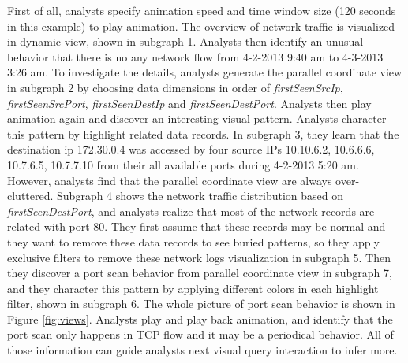 \documentclass[journal]{vgtc}                %
\begin{document}
{First of all, analysts specify animation speed and time window size (120 seconds in this example) to play animation. The overview of network traffic is visualized in dynamic view, shown in subgraph 1. Analysts then identify an unusual behavior that there is no any network flow from 4-2-2013 9:40 am to 4-3-2013 3:26 am. To investigate the details, analysts generate the parallel coordinate view in subgraph 2 by choosing data dimensions in order of \emph{firstSeenSrcIp}, \emph{firstSeenSrcPort}, \emph{firstSeenDestIp} and \emph{firstSeenDestPort}. Analysts then play animation again and discover an interesting visual pattern. Analysts character this pattern by highlight related data records. In subgraph 3, they learn that the destination ip 172.30.0.4 was accessed by four source IPs 10.10.6.2, 10.6.6.6, 10.7.6.5, 10.7.7.10 from their all available ports during 4-2-2013 5:20 am. However, analysts find that the parallel coordinate view are always over-cluttered.  Subgraph 4 shows the network traffic distribution based on \emph{firstSeenDestPort}, and analysts realize that most of the network records are related with port 80. They first assume that these records may be normal and they want to remove these data records to see buried patterns, so they apply exclusive filters to remove these network logs visualization in subgraph 5. Then they discover a port scan behavior from parallel coordinate view in subgraph 7, and they character this pattern by applying different colors in each highlight filter, shown in subgraph 6.  The whole picture of port scan behavior is shown in Figure \ref{fig:views}. Analysts play and play back animation, and identify that the port scan only happens in TCP flow and it may be a periodical behavior. All of those information can guide analysts next visual query interaction to infer more.



}
\end{document}
